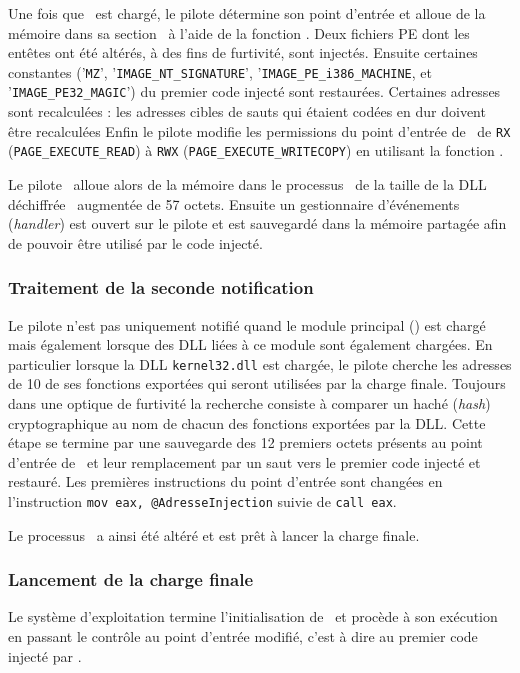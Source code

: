 Une fois que \services\ est chargé, le pilote détermine son point d'entrée et alloue de la mémoire dans sa section \pdata\ à l'aide de la fonction \ZwA.
Deux fichiers PE dont les entêtes ont été altérés, à des fins de furtivité, sont injectés.
Ensuite certaines constantes ('\texttt{MZ}', '\texttt{IMAGE\_NT\_SIGNATURE}', '\texttt{IMAGE\_PE\_i386\_MACHINE}, et '\texttt{IMAGE\_PE32\_MAGIC}') du premier code injecté sont restaurées.
Certaines adresses sont recalculées : les adresses cibles de sauts qui étaient codées en dur doivent être recalculées
Enfin le pilote modifie les permissions du point d'entrée de \services\ de \texttt{RX} (\texttt{PAGE\_EXECUTE\_READ}) à \texttt{RWX} (\texttt{PAGE\_EXECUTE\_WRITECOPY}) en utilisant la fonction \ZwP.

Le pilote \driver\ alloue alors de la mémoire dans le processus \services\ de la taille de la DLL déchiffrée \netpDLL\ augmentée de 57 octets.
Ensuite un gestionnaire d’événements (\emph{handler}) est ouvert sur le pilote et est sauvegardé dans la mémoire partagée afin de pouvoir être utilisé par le code injecté.

\subsubsection{Traitement de la seconde notification}
Le pilote n'est pas uniquement notifié quand le module principal (\services) est chargé mais également lorsque des DLL liées à ce module sont également chargées.
En particulier lorsque la DLL \texttt{kernel32.dll} est chargée, le pilote cherche les adresses de 10 de ses fonctions exportées qui seront utilisées par la charge finale.
Toujours dans une optique de furtivité la recherche consiste à comparer un haché (\emph{hash}) cryptographique au nom de chacun des fonctions exportées par la DLL.
Cette étape se termine par une sauvegarde des 12 premiers octets présents au point d'entrée de \services\ et leur remplacement par un saut vers le premier code injecté et restauré.
Les premières instructions du point d'entrée sont changées en l'instruction \texttt{mov eax, @AdresseInjection} suivie de \texttt{call eax}.

Le processus \services\ a ainsi été altéré et est prêt à lancer la charge finale.

\subsubsection{Lancement de la charge finale}
Le système d'exploitation termine l'initialisation de \services\ et procède à son exécution en passant le contrôle au point d'entrée modifié, c'est à dire au premier code injecté par \duqu.


